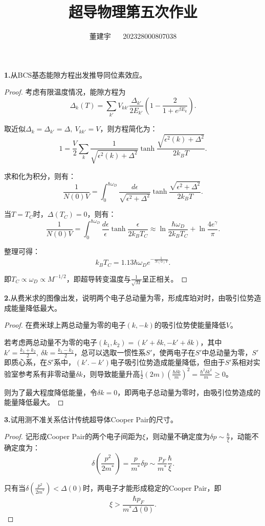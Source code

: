 \documentclass[reqno,a4paper,12pt]{amsart}
\title{超导物理第五次作业}
\author{董建宇 ~~ 202328000807038}
\begin{document}
\maketitle

\textbf{1.}从BCS基态能隙方程出发推导同位素效应。
\begin{proof}
考虑有限温度情况，能隙方程为
\[
	\Delta_k(T) = \sum_{k'} V_{kk'} \frac{\Delta_{k'}}{2E_{k'}} \left( 1 - \frac{2}{1+e^{\beta E_k}} \right).
\]

取近似$\Delta_k = \Delta_{k'} = \Delta, \ V_{kk'} = V$，则方程简化为：
\[
	1 = \frac{V}{2} \sum_k \frac{1}{\sqrt{\epsilon^2(k) + \Delta^2}} \tanh \frac{\sqrt{\epsilon^2(k) + \Delta^2}}{2k_BT}.
\]

求和化为积分，则有：
\[
	\frac{1}{N(0)V} = \int_0^{\hbar\omega_D} \frac{d\epsilon}{\sqrt{\epsilon^2 + \Delta^2}}\tanh \frac{\sqrt{\epsilon^2 + \Delta^2}}{2k_BT}.
\]

当$T = T_C$时，$\Delta(T_C) = 0$，则有：
\[
	\frac{1}{N(0)V} = \int_0^{\hbar\omega_D} \frac{d\epsilon}{\epsilon} \tanh\frac{\epsilon}{2k_BT_C} \approx \ln \frac{\hbar\omega_D}{2k_BT_C} + \ln \frac{4e^\gamma}{\pi}.
\]

整理可得：
\[
	k_BT_C = 1.13\hbar\omega_D e^{-\frac{1}{N(0)V}}.
\]

即$T_C \propto \omega_D \propto M^{-1/2}$，即超导转变温度与$\frac{1}{\sqrt{M}}$呈正相关。
\end{proof}

\medskip

\textbf{2.}从费米求的图像出发，说明两个电子总动量为零，形成库珀对时，由吸引位势造成能量降低最大。
\begin{proof}
在费米球上两总动量为零的电子$(k, -k)$的吸引位势使能量降低$V$。

若考虑两总动量不为零的电子$(k_1, k_2) = (k'+\delta k, -k'+\delta k)$，其中$k' = \frac{k_1+k_2}{2}, \ \delta k = \frac{k_1-k_2}{2}$，总可以选取一惯性系$S'$，使两电子在$S'$中总动量为零，$S'$即质心系，在$S'$系中，$(k'. -k')$电子吸引位势造成能量降低，但由于$S'$系相对实验室参考系有非零动量$\delta k$，则导致能量升高$\frac{1}{2}(2m)\left(\frac{\hbar\delta k}{m}\right)^2 = \frac{\hbar^2\delta k^2}{m} \geq 0$。

则为了最大程度降低能量，令$\delta k = 0$，即两电子总动量为零时，由吸引位势造成的能量降低最大。
\end{proof}

\medskip

\textbf{3.}试用测不准关系估计传统超导体Cooper Pair的尺寸。
\begin{proof}
记形成Cooper Pair的两个电子间距为$\xi$，则动量不确定度为$\delta p \sim \frac{\hbar}{\xi}$，动能不确定度为：
\[
	\delta\left( \frac{p^2}{2m^*} \right) = \frac{p}{m^*} \delta p \sim \frac{p_F}{m^*} \frac{\hbar}{\xi}.
\]

只有当$\delta\left( \frac{p^2}{2m^*} \right)<\Delta(0)$时，两电子才能形成稳定的Cooper Pair，即
\[
	\xi > \frac{\hbar p_F}{m^*\Delta(0)}.
\]
\end{proof}
\end{document}
